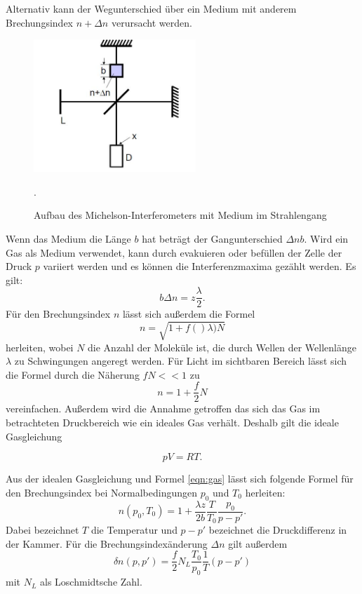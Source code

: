 Alternativ kann der Wegunterschied über ein Medium mit anderem Brechungsindex $n+\Delta n$
verursacht werden.
\begin{figure}[H]
  \centering
  \includegraphics[height=5cm]{gas.JPG}
  \caption{Aufbau des Michelson-Interferometers mit Medium im Strahlengang}
  \label{fig:gas}
  \cite{skript}.
\end{figure}

Wenn das Medium die Länge $b$ hat beträgt der Gangunterschied $\Delta nb$.
Wird ein Gas als Medium verwendet, kann durch evakuieren oder befüllen der Zelle der
Druck $p$ variiert werden und es können die Interferenzmaxima gezählt werden.
Es gilt:
\begin{equation}
  b\Delta n = z \frac{\lambda}{2}
  \label{eqn:gas}.
\end{equation}
Für den Brechungsindex $n$ lässt sich außerdem die Formel
\begin{equation}
  n=\sqrt{1+f()\lambda)N}
\end{equation}
herleiten, wobei $N$ die Anzahl der Moleküle ist, die durch Wellen der Wellenlänge
$\lambda$ zu Schwingungen angeregt werden. Für Licht im sichtbaren Bereich lässt
sich die Formel durch die Näherung $fN<<1$  zu
\begin{equation}
  n=1+\frac{f}{2}N
\end{equation}
vereinfachen.
Außerdem wird die Annahme getroffen das sich das Gas im betrachteten Druckbereich
wie ein ideales Gas verhält. Deshalb gilt die ideale Gasgleichung

\begin{equation}
  pV=RT.
\end{equation}

Aus der idealen Gasgleichung und Formel \ref{eqn:gas} lässt sich folgende Formel für
den Brechungsindex bei Normalbedingungen $p_{0}$ und $T_{0}$ herleiten:
\begin{equation}
  n(p_{0},T_{0})= 1+ \frac{\lambda z}{2b}\frac{T}{T_{0}}\frac{p_{0}}{p-p'}.
  \label{eqn:brech}
\end{equation}
Dabei bezeichnet $T$ die Temperatur und $p-p'$ bezeichnet die Druckdifferenz in der Kammer.
Für die Brechungsindexänderung $\Delta n$ gilt außerdem
\begin{equation}
  \delta n(p,p')= \frac{f}{2}N_{L}\frac{T_{0}}{p_{0}}\frac{1}{T}(p-p')
\end{equation}
mit $N_{L}$ als Loschmidtsche Zahl.
